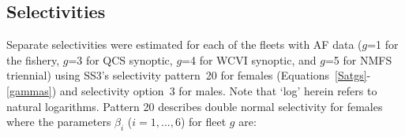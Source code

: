 \documentclass[11pt]{book}
\begin{document}
\subsection{Selectivities} \label{ss:select}

Separate selectivities were estimated for each of the fleets with AF data ($g$=1 for the fishery, $g$=3 for QCS synoptic, $g$=4 for WCVI synoptic, and $g$=5 for NMFS triennial) using SS3's selectivity pattern~20 for females (Equations~\ref{Satgs}-\ref{gammas}) and selectivity option~3 for males.
Note that `log' herein refers to natural logarithms. %
Pattern 20 describes double normal selectivity for females where the parameters $\beta_i$ ($i=1,...,6$) for fleet $g$ are:
\end{document}
